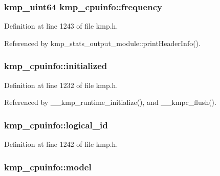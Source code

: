 \hypertarget{structkmp__cpuinfo_a8daaba40f317228e14dc2e37ad8b0170}{
\subsubsection[{frequency}]{\setlength{\rightskip}{0pt plus 5cm}kmp\-\_\-uint64 kmp\-\_\-cpuinfo\-::frequency}}\label{structkmp__cpuinfo_a8daaba40f317228e14dc2e37ad8b0170}


Definition at line 1243 of file kmp.\-h.



Referenced by kmp\-\_\-stats\-\_\-output\-\_\-module\-::print\-Header\-Info().

\hypertarget{structkmp__cpuinfo_a340553795a3c12f5f72d3333027dc1ef}{
\subsubsection[{initialized}]{ kmp\-\_\-cpuinfo\-::initialized}}\label{structkmp__cpuinfo_a340553795a3c12f5f72d3333027dc1ef}


Definition at line 1232 of file kmp.\-h.



Referenced by \-\_\-\-\_\-kmp\-\_\-runtime\-\_\-initialize(), and \-\_\-\-\_\-kmpc\-\_\-flush().

\hypertarget{structkmp__cpuinfo_a321ce01f5bddf1ca648122ce827b5fb1}{
\subsubsection[{logical\-\_\-id}]{ kmp\-\_\-cpuinfo\-::logical\-\_\-id}}\label{structkmp__cpuinfo_a321ce01f5bddf1ca648122ce827b5fb1}


Definition at line 1242 of file kmp.\-h.

\hypertarget{structkmp__cpuinfo_afbf2c46e7d9c4e8f38e78be63e12f34c}{
\subsubsection[{model}]{ kmp\-\_\-cpuinfo\-::model}}\label{structkmp__cpuinfo_afbf2c46e7d9c4e8f38e78be63e12f34c}


